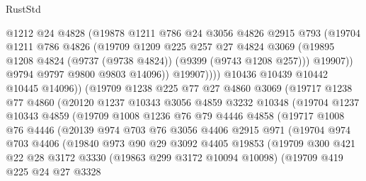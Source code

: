 \begin{lexlean}{RustStd}
\begin{coremodule}
                    @1212
                    @24
                    @4828
                    (@19878
                      @1211
                      @786
                      @24
                      @3056
                      @4826
                      @2915
                      @793
                      (@19704
                        @1211
                        @786
                        @4826
                        (@19709
                          @1209
                          @225
                          @257
                          @27
                          @4824
                          @3069
                          (@19895 @1208 @4824 (@9737 (@9738 @4824)) (@9399 (@9743 @1208 @257)))
                          @19907))
                      @9794
                      @9797
                      @9800
                      @9803
                      @14096))
                  @19907))))
          @10436
          @10439
          @10442
          @10445
          @14096))
      (@19709
        @1238
        @225
        @77
        @27
        @4860
        @3069
        (@19717
          @1238
          @77
          @4860
          (@20120
            @1237
            @10343
            @3056
            @4859
            @3232
            @10348
            (@19704
              @1237
              @10343
              @4859
              (@19709
                @1008
                @1236
                @76
                @79
                @4446
                @4858
                (@19717
                  @1008
                  @76
                  @4446
                  (@20139
                    @974
                    @703
                    @76
                    @3056
                    @4406
                    @2915
                    @971
                    (@19704
                      @974
                      @703
                      @4406
                      (@19840
                        @973
                        @90
                        @29
                        @3092
                        @4405
                        @19853
                        (@19709
                          @300
                          @421
                          @22
                          @28
                          @3172
                          @3330
                          (@19863 @299 @3172 @10094 @10098)
                          (@19709
                            @419
                            @225
                            @24
                            @27
                            @3328

\end{coremodule}
\end{lexlean}
